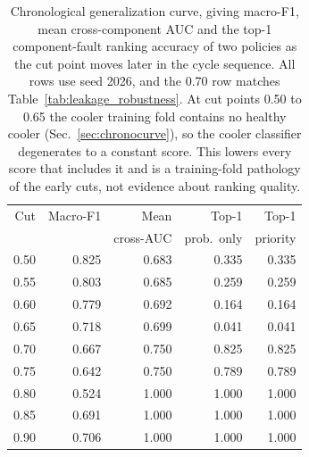 \begin{table}[t]
\centering
\caption{Chronological generalization curve, giving macro-F1, mean cross-component AUC and the top-1 component-fault ranking accuracy of two policies as the cut point moves later in the cycle sequence. All rows use seed 2026, and the 0.70 row matches Table~\ref{tab:leakage_robustness}. At cut points 0.50 to 0.65 the cooler training fold contains no healthy cooler (Sec.~\ref{sec:chronocurve}), so the cooler classifier degenerates to a constant score. This lowers every score that includes it and is a training-fold pathology of the early cuts, not evidence about ranking quality.}
\label{tab:chronocurve}
\footnotesize
\setlength{\tabcolsep}{4pt}
\begin{tabular}{rrrrr}
\hline
Cut & Macro-F1 & Mean & Top-1 & Top-1 \\
 & & cross-AUC & prob.\ only & priority \\
\hline
0.50 & 0.825 & 0.683 & 0.335 & 0.335 \\
0.55 & 0.803 & 0.685 & 0.259 & 0.259 \\
0.60 & 0.779 & 0.692 & 0.164 & 0.164 \\
0.65 & 0.718 & 0.699 & 0.041 & 0.041 \\
0.70 & 0.667 & 0.750 & 0.825 & 0.825 \\
0.75 & 0.642 & 0.750 & 0.789 & 0.789 \\
0.80 & 0.524 & 1.000 & 1.000 & 1.000 \\
0.85 & 0.691 & 1.000 & 1.000 & 1.000 \\
0.90 & 0.706 & 1.000 & 1.000 & 1.000 \\
\hline
\end{tabular}
\end{table}
